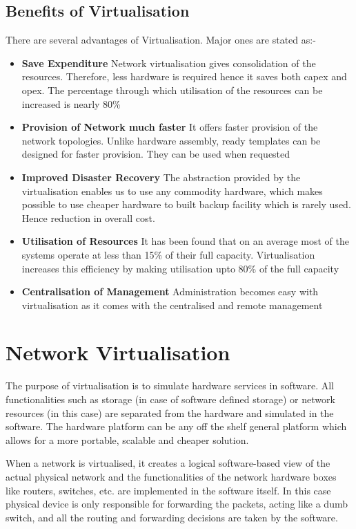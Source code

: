 \subsection{Benefits of Virtualisation}

There are several advantages of Virtualisation. Major ones are stated as:- 

\begin{itemize}
    \item \textbf{Save Expenditure} Network virtualisation gives consolidation of the resources. Therefore, less hardware is required hence it saves both capex and opex. The percentage through which utilisation of the resources can be increased is nearly 80\%
     \item \textbf{Provision of Network much faster} It offers faster provision of the network topologies. Unlike hardware assembly, ready templates can be designed for faster provision. They can be used when requested
     
      \item \textbf{Improved Disaster Recovery} The abstraction provided by the virtualisation enables us to use any commodity hardware, which makes possible to use cheaper hardware to built backup facility which is rarely used. Hence reduction in overall cost.
      
       \item \textbf{Utilisation of Resources} It has been found that on an average most of the systems operate at less than 15\% of their full capacity. Virtualisation increases this efficiency by making utilisation upto 80\% of the full capacity
        \item \textbf{Centralisation of Management} Administration becomes easy with virtualisation as it comes with the centralised and remote management
\end{itemize}


\section{Network Virtualisation}
The purpose of virtualisation is to simulate hardware services in software. All functionalities such as storage (in case of software defined storage) or network resources (in this case) are separated from the hardware and simulated in the software. The hardware platform can be any off the shelf general platform which allows for a more portable, scalable and cheaper solution.

When a network is virtualised, it creates a logical software-based view of the actual physical network and the functionalities of the network hardware boxes like routers, switches, etc. are implemented in the software itself. In this case physical device is only responsible for forwarding the packets, acting like a dumb switch, and all the routing and forwarding decisions are taken by the software.

